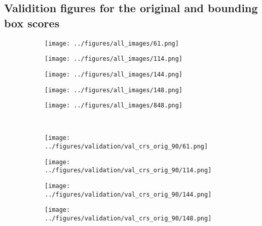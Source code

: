 \newpage
\subsection{Validition figures for the original and bounding box scores}\label{SS:furtherval}
\begin{figure}[h!]
	\begin{subfigure}{0.19\textwidth}
		\centering
		\texttt{[image: ../figures/all\_images/61.png]}
		\label{fig:1}
	\end{subfigure}
	\begin{subfigure}{0.19\textwidth}
		\centering
		\texttt{[image: ../figures/all\_images/114.png]}
		\label{fig:1}
	\end{subfigure}
	\begin{subfigure}{0.19\textwidth}
		\centering
		\texttt{[image: ../figures/all\_images/144.png]}
		\label{fig:1}
	\end{subfigure}
	\begin{subfigure}{0.19\textwidth}
		\centering
		\texttt{[image: ../figures/all\_images/148.png]}
		\label{fig:1}
	\end{subfigure}
	\begin{subfigure}{0.19\textwidth}
		\centering
		\texttt{[image: ../figures/all\_images/848.png]}
		\label{fig:1}
	\end{subfigure}
	\vspace{-0.35cm}
	\\
	\begin{subfigure}{0.19\textwidth}
		\centering
		\texttt{[image: ../figures/validation/val\_crs\_orig\_90/61.png]}
		\label{fig:1}
	\end{subfigure}
	\begin{subfigure}{0.19\textwidth}
		\centering
		\texttt{[image: ../figures/validation/val\_crs\_orig\_90/114.png]}
		\label{fig:1}
	\end{subfigure}
	\begin{subfigure}{0.19\textwidth}
		\centering
		\texttt{[image: ../figures/validation/val\_crs\_orig\_90/144.png]}
		\label{fig:1}
	\end{subfigure}
	\begin{subfigure}{0.19\textwidth}
		\centering
		\texttt{[image: ../figures/validation/val\_crs\_orig\_90/148.png]}
		\label{fig:1}
	\end{subfigure}
	\begin{subfigure}{0.19\textwidth}

\end{subfigure}
\end{figure}

